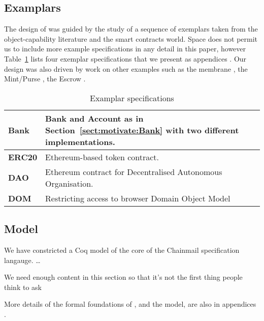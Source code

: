 

\subsection{Examplars}

The design of \Chainmail was guided by the study of a sequence of
exemplars taken from the object-capability literature and the smart
contracts world.  
Space does not permit us to include more example specifications in any
detail in this paper, however 
%
Table~\ref{table} lists four exemplar specifications that we present as
appendices \cite{examples}. Our design was also driven by work on other
examples such as the membrane \cite{membranesJavascript},
the Mint/Purse \cite{MillerPhD}, the Escrow \cite{proxiesECOOP2013,swapsies}.

\begin{table}
  \begin{tabular}{|l|l|}
    \hline
\textbf{Bank} \cite{arnd18} & Bank and Account as in
Section~\ref{sect:motivate:Bank} with two different implementations.\\
\hline
\textbf{ERC20} \cite{ERC20} &   Ethereum-based token contract.\\
\hline
\textbf{DAO} \cite{Dao,DaoBug} & Ethereum contract for Decentralised Autonomous
Organisation.\\
\hline
\textbf{DOM} \cite{dd,ddd} & Restricting access to browser Domain Object Model\\
    \hline
  \end{tabular}
  \caption{Examplar specifications \cite{examples}}
  \label{table}
\end{table}





\subsection{Model}


We have constricted a Coq model of the core of the Chainmail
specification langauge. \ldots


    We need enough content in this section
so that it's not the first thing people think to ask

More details of the formal foundations of \Chainmail, and the model,
are also in appendices \cite{examples}.

